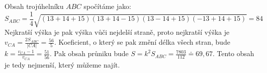 \documentclass{fkssolpub}
\begin{document}
Obsah trojúhelníku $ABC$ spočítáme jako:
\[
	S_{ABC} = \frac{1}{4} \sqrt{(13 + 14 + 15) (13 + 14 - 15) (13 - 14 + 15) (-13 + 14 + 15)} = 84
\]
Nejkratší výška je pak výška vůči nejdelší straně, proto nejkratší výška je $v_{CA} = \frac{2 S_{ABC}}{|CA|} = \frac{56}{5}$. Koeficient, o který se pak změní délka všech stran, bude $k = \frac{v_{CA} - 1}{v_{CA}} = \frac{51}{56}$. Pak obsah průniku bude $S = k^2 S_{ABC} = \frac{7803}{112} \doteq 69{,}67$. Tento obsah je tedy nejmenší, který můžeme najít.
\end{document}
